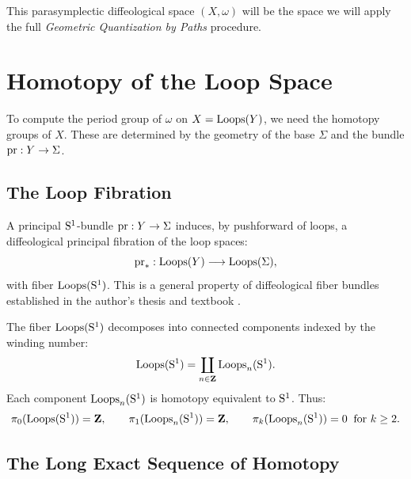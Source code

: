 \documentclass[11pt,reqno,letterpaper,twoside]{amsart}
\begin{document}
  This parasymplectic diffeological space $(X, \omega)$ will be the space we will apply the full \emph{Geometric Quantization by Paths} procedure.
  
  \section{Homotopy of the Loop Space}
  
  To compute the period group of $\omega$ on $X = \operatorname{Loops}(Y)$,
  we need the homotopy groups of $X$.
  These are determined by the geometry of the base $\Sigma$ and the bundle $\pr: Y \to \Sigma$.
  
  \subsection{The Loop Fibration}
  
  A principal $\mathrm{S}^1$-bundle $\pr: Y \to \Sigma$ induces,
  by pushforward of loops,
  a diffeological principal fibration of the loop spaces:
  \[
    \pr_*: \Loops(Y) \longrightarrow \Loops(\Sigma),
    \]
  with fiber $\operatorname{Loops}(\mathrm{S}^1)$.
  This is a general property of diffeological fiber bundles
  established in the author's thesis and textbook \cite{PIZ85,PIZ13}.
  
  The fiber $\operatorname{Loops}(\mathrm{S}^1)$ decomposes into connected components
  indexed by the winding number:
  \[
    \operatorname{Loops}(\mathrm{S}^1) = \coprod_{n \in {\mathbf{Z}}} \operatorname{Loops}_n(\mathrm{S}^1).
    \]
  Each component $\operatorname{Loops}_n(\mathrm{S}^1)$ is homotopy equivalent to $\mathrm{S}^1$.
  Thus:
  \[
    \pi_0(\operatorname{Loops}(\mathrm{S}^1)) = {\mathbf{Z}},
    \qquad
    \pi_1(\operatorname{Loops}_n(\mathrm{S}^1)) = {\mathbf{Z}},
    \qquad
    \pi_k(\operatorname{Loops}_n(\mathrm{S}^1)) = 0 \;\; \text{for } k \geq 2.
    \]
  
  \subsection{The Long Exact Sequence of Homotopy}
  
\end{document}
